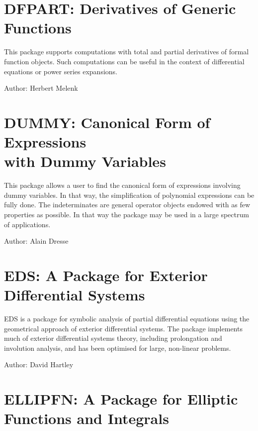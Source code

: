 \section{DFPART: Derivatives of Generic Functions}

This package supports computations with total and partial derivatives of
formal function objects.  Such computations can be useful in the context
of differential equations or power series expansions.

Author: Herbert Melenk



\newpage

\section[DUMMY: Canonical Form of Expressions with Dummy Variables]{DUMMY: Canonical Form of Expressions\\with Dummy Variables}

This package allows a user to find the canonical form of expressions
involving dummy variables. In that way, the simplification of
polynomial expressions can be fully done. The indeterminates are general
operator objects endowed with as few properties as possible. In that way
the package may be used in a large spectrum of applications.

Author: Alain Dresse



\newpage

\section{EDS: A Package for Exterior Differential Systems}

EDS is a \REDUCE package for symbolic analysis of partial differential
equations using the geometrical approach of exterior differential
systems. The package implements much of exterior differential systems
theory, including prolongation and involution analysis, and has been
optimised for large, non-linear problems.

Author: David Hartley



\newpage


\section{ELLIPFN: A Package for Elliptic Functions and Integrals}

